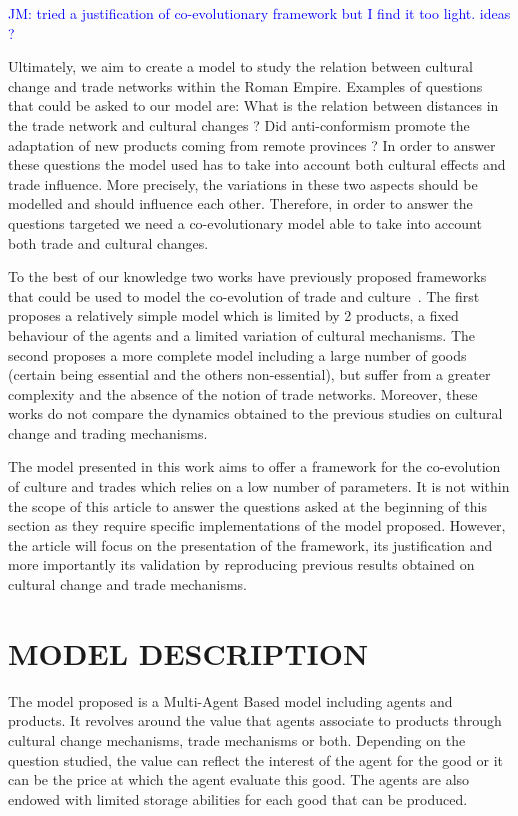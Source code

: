 \documentclass{wscpaperproc}
\newcommand{\memo}[2]{\textcolor{#1}{#2}}
\newcommand{\jm}[1]{\memo{blue}{JM: #1\\}}
\begin{document}
\jm{tried a justification of co-evolutionary framework but I find it too light. ideas ?}

Ultimately, we aim to create a model to study the relation between cultural change and trade networks within the Roman Empire. Examples of questions that could be asked to our model are: What is the relation between distances in the trade network and cultural changes ? Did anti-conformism promote the adaptation of new products coming from remote provinces ? In order to answer these questions the model used has to take into account both cultural effects and trade influence. More precisely, the variations in these two aspects should be modelled and should influence each other.  Therefore, in order to answer the questions targeted we need a co-evolutionary model able to take into account both trade and cultural changes. 

To the best of our knowledge two works have previously proposed frameworks that could be used to model the co-evolution of trade and culture~\cite{bentley_specialisation_2005,macmillan_agent-based_2008}. The first proposes a relatively simple model which is limited by 2 products, a fixed behaviour of the agents and a limited variation of cultural mechanisms. The second proposes a more complete model including a large number of goods (certain being essential and the others non-essential), but suffer from a greater complexity and the absence of the notion of trade networks. Moreover, these works do not compare the dynamics obtained to the previous studies on cultural change and trading mechanisms.

The model presented in this work aims to offer a framework for the co-evolution of culture and trades which relies on a low number of parameters. It is not within the scope of this article to answer the questions asked at the beginning of this section as they require specific implementations of the model proposed. However, the article will focus on the presentation of the framework, its justification and more importantly its validation by reproducing previous results obtained on cultural change and trade mechanisms.



\section{MODEL DESCRIPTION}

The model proposed is a Multi-Agent Based model including agents and products. It revolves around the value that agents associate to products through cultural change mechanisms, trade mechanisms or both. Depending on the question studied, the value can reflect the interest of the agent for the good or it can be the price at which the agent evaluate this good. The agents are also endowed with limited storage abilities for each good that can be produced. 
\end{document}
